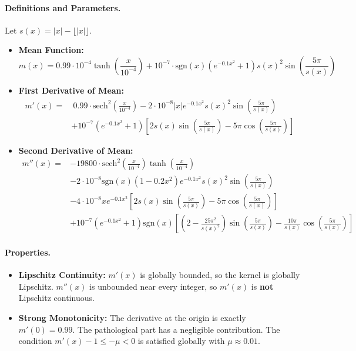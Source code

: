 \documentclass[a4paper]{article}
\begin{document}
\paragraph{Definitions and Parameters.}
Let $s(x) = |x| - \lfloor|x|\rfloor$.
\begin{itemize}
	\item \textbf{Mean Function:}
	\[ m(x) = 0.99 \cdot 10^{-4} \tanh\left(\frac{x}{10^{-4}}\right) + 10^{-7} \cdot \text{sgn}(x)(e^{-0.1x^2}+1) s(x)^2 \sin\left(\frac{5\pi}{s(x)}\right) \]
	\item \textbf{First Derivative of Mean:}
	\[ \begin{aligned} m'(x) = & \ 0.99 \cdot \text{sech}^2\left(\frac{x}{10^{-4}}\right) - 2 \cdot 10^{-8}|x|e^{-0.1x^2}s(x)^2\sin\left(\frac{5\pi}{s(x)}\right) \\ & + 10^{-7}(e^{-0.1x^2}+1)\left[2s(x)\sin\left(\frac{5\pi}{s(x)}\right) - 5\pi\cos\left(\frac{5\pi}{s(x)}\right)\right] \end{aligned} \]
	\item \textbf{Second Derivative of Mean:}
	\[ \begin{aligned} m''(x) = & -19800 \cdot \text{sech}^2\left(\frac{x}{10^{-4}}\right)\tanh\left(\frac{x}{10^{-4}}\right) \\ & - 2 \cdot 10^{-8}\text{sgn}(x)(1-0.2x^2)e^{-0.1x^2}s(x)^2\sin\left(\frac{5\pi}{s(x)}\right) \\ & - 4 \cdot 10^{-8}xe^{-0.1x^2}\left[2s(x)\sin\left(\frac{5\pi}{s(x)}\right) - 5\pi\cos\left(\frac{5\pi}{s(x)}\right)\right] \\ & + 10^{-7}(e^{-0.1x^2}+1)\text{sgn}(x)\left[\left(2 - \frac{25\pi^2}{s(x)^2}\right)\sin\left(\frac{5\pi}{s(x)}\right) - \frac{10\pi}{s(x)}\cos\left(\frac{5\pi}{s(x)}\right)\right] \end{aligned} \]
\end{itemize}
\paragraph{Properties.}
\begin{itemize}
	\item \textbf{Lipschitz Continuity:} $m'(x)$ is globally bounded, so the kernel is globally Lipschitz. $m''(x)$ is unbounded near every integer, so $m'(x)$ is \textbf{not} Lipschitz continuous.
	\item \textbf{Strong Monotonicity:} The derivative at the origin is exactly $m'(0)=0.99$. The pathological part has a negligible contribution. The condition $m'(x) - 1 \le -\mu < 0$ is satisfied globally with $\mu \approx 0.01$.
\end{itemize}
\end{document}
